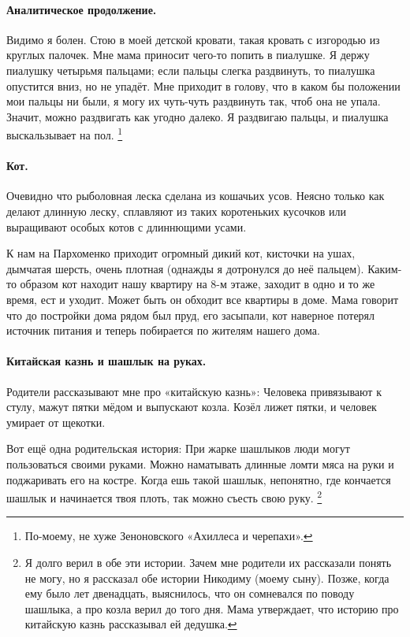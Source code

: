 \documentclass{book}
\begin{document}
\paragraph{Аналитическое продолжение.}
Видимо я болен.
Стою в моей детской кровати,
такая кровать с изгородью из круглых палочек.
Мне мама приносит чего-то попить в пиалушке.
Я держу пиалушку четырьмя пальцами;
если пальцы слегка раздвинуть, то пиалушка опустится вниз, но не упадёт.
Мне приходит в голову, что в каком бы положении мои пальцы ни были, я могу их чуть-чуть раздвинуть так, чтоб она не упала.
Значит, можно раздвигать как угодно далеко.
Я раздвигаю пальцы, и пиалушка выскальзывает на пол.%
\footnote{По-моему, не хуже Зеноновского «Ахиллеса и черепахи».}

\paragraph{Кот.}
Очевидно что рыболовная леска сделана из кошачьих усов.
Неясно только как делают длинную леску,  сплавляют из таких коротеньких кусочков 
или выращивают особых котов с длиннющими усами.

К нам на Пархоменко приходит огромный дикий кот, 
кисточки на ушах, дымчатая  шерсть,
очень плотная
(однажды я дотронулся до неё пальцем).
Каким-то образом кот находит нашу квартиру на 8-м этаже, заходит в одно и то же время, ест и уходит.
Может быть он обходит все квартиры в доме.
Мама говорит что до постройки дома рядом был пруд, его засыпали,
кот наверное потерял источник питания и теперь побирается по жителям нашего дома.

\paragraph{Китайская казнь и шашлык на руках.}
Родители рассказывают мне про «китайскую казнь»: 
Человека привязывают к стулу, мажут пятки мёдом и выпускают козла.
Козёл лижет пятки, и человек умирает от щекотки.

Вот ещё одна родительская история:
При жарке шашлыков люди могут пользоваться своими руками.
Можно наматывать длинные ломти мяса на руки и поджаривать его на костре.
Когда ешь такой шашлык, непонятно, где кончается шашлык и начинается твоя плоть,
так можно съесть свою руку.%
\footnote{Я долго верил в  обе эти истории.
Зачем мне родители их рассказали понять не могу, 
но я рассказал обе истории Никодиму (моему сыну).
Позже, когда ему было лет двенадцать,
выяснилось, что он сомневался по поводу шашлыка, а про козла верил до того дня.
Мама утверждает, что историю про китайскую казнь рассказывал ей дедушка.}
\end{document}
